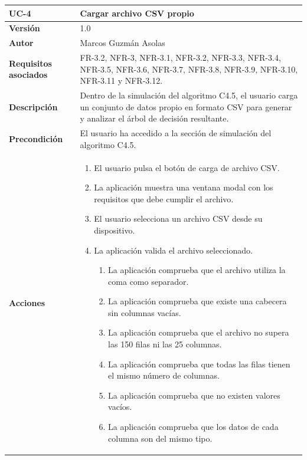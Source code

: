 \begin{table}[p]
    \centering
    \begin{tabularx}{\linewidth}{p{} p{}}
        \toprule
        \textbf{UC-4} & \textbf{Cargar archivo CSV propio} \\
        \toprule
        \textbf{Versión} & 1.0 \\
        \textbf{Autor} & Marcos Guzmán Asolas \\
        \textbf{Requisitos asociados} & FR-3.2, NFR-3, NFR-3.1, NFR-3.2, NFR-3.3, NFR-3.4, NFR-3.5, NFR-3.6, NFR-3.7, NFR-3.8, NFR-3.9, NFR-3.10, NFR-3.11 y NFR-3.12. \\
        \textbf{Descripción} & Dentro de la simulación del algoritmo C4.5, el usuario carga un conjunto de datos propio en formato CSV para generar y analizar el árbol de decisión resultante. \\
        \textbf{Precondición} & El usuario ha accedido a la sección de simulación del algoritmo C4.5. \\
        \textbf{Acciones} &
        \begin{enumerate}
            \def\labelenumi{\arabic{enumi}.}
            \tightlist
            \item El usuario pulsa el botón de carga de archivo CSV.
            \item La aplicación muestra una ventana modal con los requisitos que debe cumplir el archivo.
            \item El usuario selecciona un archivo CSV desde su dispositivo.
            \item La aplicación valida el archivo seleccionado.
            \begin{enumerate}
                \item La aplicación comprueba que el archivo utiliza la coma como separador.
                \item La aplicación comprueba que existe una cabecera sin columnas vacías.
                \item La aplicación comprueba que el archivo no supera las 150 filas ni las 25 columnas.
                \item La aplicación comprueba que todas las filas tienen el mismo número de columnas.
                \item La aplicación comprueba que no existen valores vacíos.
                \item La aplicación comprueba que los datos de cada columna son del mismo tipo.

\end{enumerate}
\end{enumerate}
\end{tabularx}
\end{table}
